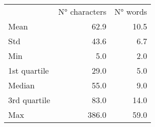 \begin{tabular}{lrr}
 & N° characters & N° words \\
Mean & 62.9 & 10.5 \\
Std & 43.6 & 6.7 \\
Min & 5.0 & 2.0 \\
1st quartile & 29.0 & 5.0 \\
Median & 55.0 & 9.0 \\
3rd quartile & 83.0 & 14.0 \\
Max & 386.0 & 59.0 \\
\end{tabular}
